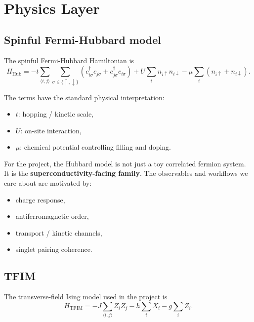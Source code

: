 \documentclass[11pt]{article}
\begin{document}
\section{Physics Layer}

\subsection{Spinful Fermi-Hubbard model}

The spinful Fermi-Hubbard Hamiltonian is
\begin{equation}
H_{\mathrm{Hub}}
=
-t \sum_{\langle i,j\rangle}\sum_{\sigma\in\{\uparrow,\downarrow\}}
\left(c_{i\sigma}^{\dagger}c_{j\sigma}+c_{j\sigma}^{\dagger}c_{i\sigma}\right)
+U\sum_i n_{i\uparrow}n_{i\downarrow}
-\mu\sum_i(n_{i\uparrow}+n_{i\downarrow}).
\label{eq:hubbard}
\end{equation}

The terms have the standard physical interpretation:

\begin{itemize}
\item \(t\): hopping / kinetic scale,
\item \(U\): on-site interaction,
\item \(\mu\): chemical potential controlling filling and doping.
\end{itemize}

For the project, the Hubbard model is not just a toy correlated fermion system. It is the \textbf{superconductivity-facing family}. The observables and workflows we care about are motivated by:

\begin{itemize}
\item charge response,
\item antiferromagnetic order,
\item transport / kinetic channels,
\item singlet pairing coherence.
\end{itemize}

\subsection{TFIM}

The transverse-field Ising model used in the project is
\begin{equation}
H_{\mathrm{TFIM}}
=
-J \sum_{\langle i,j\rangle} Z_i Z_j
-h \sum_i X_i
-g \sum_i Z_i.
\label{eq:tfim}
\end{equation}
\end{document}
